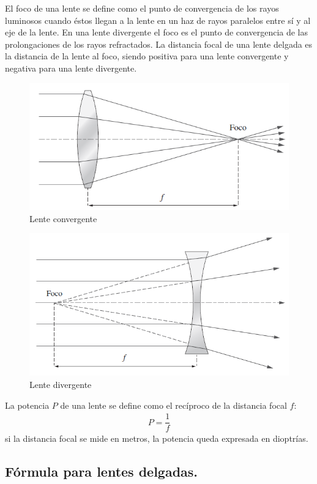 \documentclass[14pt]{extarticle}
\begin{document}
El foco de una lente se define como el punto de convergencia de los rayos luminosos cuando éstos llegan a la lente en un haz de rayos paralelos entre sí y al eje de la lente. En una lente divergente el foco es el punto de convergencia de las prolongaciones de los rayos refractados. La distancia focal de una lente delgada es la distancia de la lente al foco, siendo positiva para una lente convergente y negativa para una lente divergente.
\begin{figure}[H]
    \centering
    \includegraphics[scale=0.75]{Imagenes/Lentes_02.png}
    \caption{Lente convergente}
\end{figure}
\begin{figure}[H]
    \centering
    \includegraphics[scale=0.75]{Imagenes/Lentes_03.png}
    \caption{Lente divergente}
\end{figure}
La potencia $P$ de una lente se define como el recíproco de la distancia focal $f$:
\begin{align}
P = \dfrac{1}{f}
\label{eq:ecuacion_II_01}
\end{align}
si la distancia focal se mide en metros, la potencia queda expresada en dioptrías.

\subsection{Fórmula para lentes delgadas.}
\end{document}
